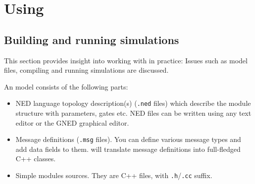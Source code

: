 %
%
%
%
%
%


\section{Using {\opp}}


\subsection{Building and running simulations}

This section provides insight into working with {\opp} in practice:
Issues such as model files, compiling and running simulations are
discussed.

An {\opp} model consists of the following parts:
\begin{itemize}
  \item{NED language topology description(s) (\texttt{.ned} files)
    which describe the module structure with parameters, gates etc.
    NED files can be written using any text editor or the
    GNED graphical editor.}
  \item{Message definitions (\texttt{.msg} files). You can define various message
    types and add data fields to them. {\opp} will translate message definitions
    into full-fledged C++ classes.}
  \item{Simple modules sources. They are C++ files, with \texttt{.h}/\texttt{.cc} suffix.}
\end{itemize}

